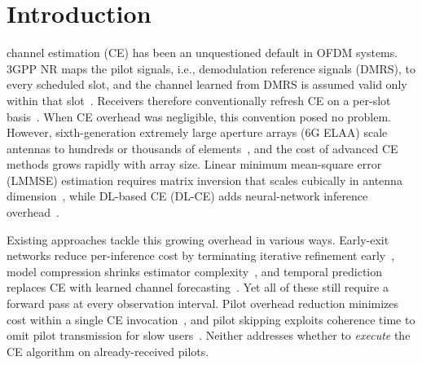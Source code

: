 
\section{Introduction}\label{sec:intro}

 channel estimation (CE) has been an unquestioned default in OFDM systems.
3GPP NR maps the pilot signals, i.e., demodulation reference signals (DMRS), to every scheduled slot, and the channel learned from DMRS is assumed valid only within that slot~\cite{3gpp_ts38211}.
Receivers therefore conventionally refresh CE on a per-slot basis~\cite{edfors1998ofdm}.
When CE overhead was negligible, this convention posed no problem.
However, sixth-generation extremely large aperture arrays (6G ELAA) scale antennas to hundreds or thousands of elements~\cite{cui2022channel, bjornson2024towards}, and the cost of advanced CE methods grows rapidly with array size. Linear minimum mean-square error (LMMSE) estimation requires matrix inversion that scales cubically in antenna dimension~\cite{shariati2014low}, while DL-based CE (DL-CE) adds neural-network inference overhead~\cite{requestnet2025, channelformer2023}.

Existing approaches tackle this growing overhead in various ways.
Early-exit networks reduce per-inference cost by terminating iterative refinement early~\cite{icenet2025}, model compression shrinks estimator complexity~\cite{channelformer2023}, and temporal prediction replaces CE with learned channel forecasting~\cite{continual_pred2025}.
Yet all of these still require a forward pass at every observation interval.
Pilot overhead reduction minimizes cost within a single CE invocation~\cite{channelformer2023}, and pilot skipping exploits coherence time to omit pilot transmission for slow users~\cite{abboud2017channel}. Neither addresses whether to \emph{execute} the CE algorithm on already-received pilots.


